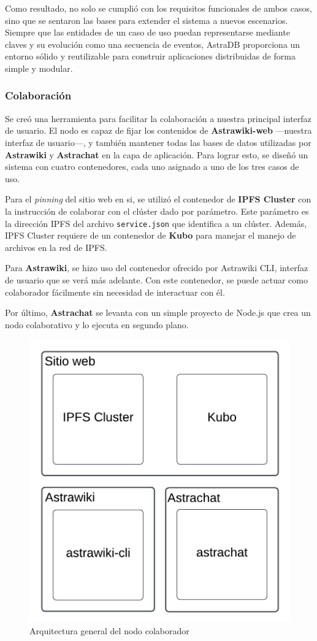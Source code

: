 Como resultado, no solo se cumplió con los requisitos funcionales de ambos casos, sino que se sentaron las bases para extender el sistema a nuevos escenarios. Siempre que las entidades de un caso de uso puedan representarse mediante claves y su evolución como una secuencia de eventos, AstraDB proporciona un entorno sólido y reutilizable para construir aplicaciones distribuidas de forma simple y modular.


\subsubsection{Colaboración}

Se creó una herramienta para facilitar la colaboración a nuestra principal interfaz de usuario. El nodo es capaz de fijar los contenidos de \textbf{Astrawiki-web} —nuestra interfaz de usuario—, y también mantener todas las bases de datos utilizadas por \textbf{Astrawiki} y \textbf{Astrachat} en la capa de aplicación. Para lograr esto, se diseñó un sistema con cuatro contenedores, cada uno asignado a uno de los tres casos de uso.

Para el \textit{pinning} del sitio web en si, se utilizó el contenedor de \textbf{IPFS Cluster} con la instrucción de colaborar con el clúster dado por parámetro. Este parámetro es la dirección IPFS del archivo \texttt{service.json} que identifica a un clúster. Además, IPFS Cluster requiere de un contenedor de \textbf{Kubo} para manejar el manejo de archivos en la red de IPFS.

Para \textbf{Astrawiki}, se hizo uso del contenedor ofrecido por Astrawiki CLI, interfaz de usuario que se verá más adelante. Con este contenedor, se puede actuar como colaborador fácilmente sin necesidad de interactuar con él.

Por último, \textbf{Astrachat} se levanta con un simple proyecto de Node.js que crea un nodo colaborativo y lo ejecuta en segundo plano.

\begin{figure}[H]
    \centering
    \includegraphics[width=0.5\linewidth]{img/solucion-ipfs/collaborator-arch.png}
    \caption{Arquitectura general del nodo colaborador}
    \label{fig:collaborator-architecture}
\end{figure}

